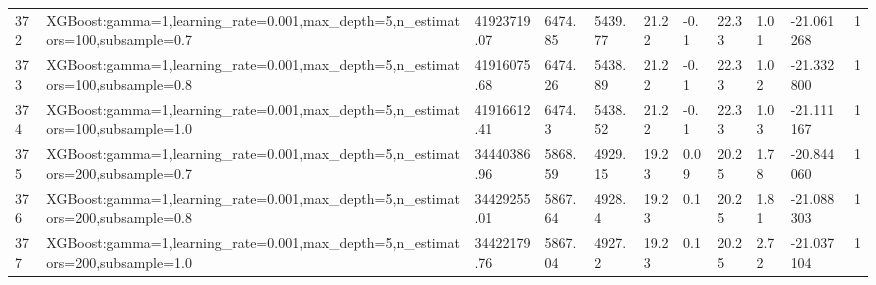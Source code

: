 \begin{longtable}{C{0.8cm} L{2cm} C{1.15cm} C{1.15cm} C{1.15cm} C{1.15cm} C{0.85cm} C{1.25cm} C{1.2cm} C{1.5cm} C{1.0cm}}
372 & XGBoost:\newline gamma=1,\newline learning\_rate=0.001,\newline max\_depth=5,\newline n\_estimators=100,\newline subsample=0.7 & 41923719.07 & 6474.85 & 5439.77 & 21.22 & -0.1 & 22.33 & 1.01 & -21.061268 & 1 \\
373 & XGBoost:\newline gamma=1,\newline learning\_rate=0.001,\newline max\_depth=5,\newline n\_estimators=100,\newline subsample=0.8 & 41916075.68 & 6474.26 & 5438.89 & 21.22 & -0.1 & 22.33 & 1.02 & -21.332800 & 1 \\
374 & XGBoost:\newline gamma=1,\newline learning\_rate=0.001,\newline max\_depth=5,\newline n\_estimators=100,\newline subsample=1.0 & 41916612.41 & 6474.3 & 5438.52 & 21.22 & -0.1 & 22.33 & 1.03 & -21.111167 & 1 \\
375 & XGBoost:\newline gamma=1,\newline learning\_rate=0.001,\newline max\_depth=5,\newline n\_estimators=200,\newline subsample=0.7 & 34440386.96 & 5868.59 & 4929.15 & 19.23 & 0.09 & 20.25 & 1.78 & -20.844060 & 1 \\
376 & XGBoost:\newline gamma=1,\newline learning\_rate=0.001,\newline max\_depth=5,\newline n\_estimators=200,\newline subsample=0.8 & 34429255.01 & 5867.64 & 4928.4 & 19.23 & 0.1 & 20.25 & 1.81 & -21.088303 & 1 \\
377 & XGBoost:\newline gamma=1,\newline learning\_rate=0.001,\newline max\_depth=5,\newline n\_estimators=200,\newline subsample=1.0 & 34422179.76 & 5867.04 & 4927.2 & 19.23 & 0.1 & 20.25 & 2.72 & -21.037104 & 1 \\

\end{longtable}
